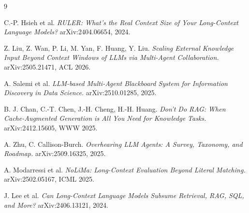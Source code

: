 \documentclass[11pt]{article}
\begin{document}
\begin{thebibliography}{9}

 C.-P. Hsieh et al.
\emph{RULER: What's the Real Context Size of Your Long-Context Language Models?}
arXiv:2404.06654, 2024.

 Z. Liu, Z. Wan, P. Li, M. Yan, F. Huang, Y. Liu.
\emph{Scaling External Knowledge Input Beyond Context Windows of LLMs via Multi-Agent
Collaboration.} arXiv:2505.21471, ACL 2026.

 A. Salemi et al.
\emph{LLM-based Multi-Agent Blackboard System for Information Discovery in Data
Science.} arXiv:2510.01285, 2025.

 B. J. Chan, C.-T. Chen, J.-H. Cheng, H.-H. Huang.
\emph{Don't Do RAG: When Cache-Augmented Generation is All You Need for Knowledge
Tasks.} arXiv:2412.15605, WWW 2025.

 A. Zhu, C. Callison-Burch.
\emph{Overhearing LLM Agents: A Survey, Taxonomy, and Roadmap.}
arXiv:2509.16325, 2025.

 A. Modarressi et al.
\emph{NoLiMa: Long-Context Evaluation Beyond Literal Matching.}
arXiv:2502.05167, ICML 2025.

 J. Lee et al.
\emph{Can Long-Context Language Models Subsume Retrieval, RAG, SQL, and More?}
arXiv:2406.13121, 2024.

\end{thebibliography}
\end{document}
